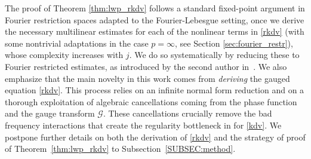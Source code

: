 \documentclass[a4paper,
11pt,  reqno]{amsart}
\newcommand{\5}{\textup{V}}
\newtheorem{proposition}[theorem]{Proposition}
\theoremstyle{remark}
\newtheorem{remark}[theorem]{Remark}
\newcommand{\R}{\mathbb{R}}
\newcommand{\Gc}{\mathcal{G}}
\numberwithin{equation}{section}
\numberwithin{theorem}{section}
\begin{document}
The proof of Theorem \ref{thm:lwp_rkdv} follows a standard fixed-point argument in Fourier restriction spaces adapted to the Fourier-Lebesgue setting,  once we derive the necessary multilinear estimates for each of the nonlinear terms in \eqref{rkdv} (with some nontrivial adaptations in the case $p=\infty$, see Section \ref{sec:fourier_restr}), whose complexity increases with $j$.
We do so systematically by reducing these to Fourier restricted estimates, as introduced by the second author in~\cite{COS}.
We also emphasize that the main novelty in this work comes from \emph{deriving} the gauged equation \eqref{rkdv}.
This process relies on an infinite normal form reduction
and on a thorough exploitation of algebraic cancellations coming from the phase function and the  gauge transform $\Gc$.
These cancellations crucially remove the bad frequency interactions that create the regularity bottleneck in \cite{Grunrock_ldv_hier} for \eqref{kdv}.
We postpone further details on both the derivation of \eqref{rkdv} and the strategy of proof of Theorem~\ref{thm:lwp_rkdv} to Subsection~\ref{SUBSEC:method}.




    \medskip




\end{document}
